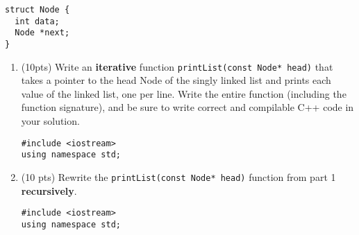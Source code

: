 \documentclass[11pt]{article}
\begin{document}
\begin{verbatim}
struct Node {
  int data;
  Node *next;
}
\end{verbatim}
\begin{enumerate}
\item (10pts) Write an \textbf{iterative} function \texttt{printList(const Node* head)} that takes a
pointer to the head Node of the singly linked list and prints each value of
the linked list, one per line. Write the entire function (including the
function signature), and be sure to write correct and compilable C++ code
in your solution.
\begin{verbatim}
#include <iostream>
using namespace std;
\end{verbatim}
\vspace{15em}

\item (10 pts) Rewrite the \texttt{printList(const Node* head)} function from part 1
\textbf{recursively}.
\begin{verbatim}
#include <iostream>
using namespace std;
\end{verbatim}
\end{enumerate}
\end{document}
